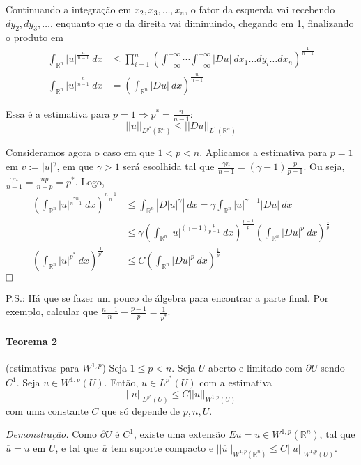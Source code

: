 \documentclass[11pt]{article}
\newcommand{\qed}{$\hfill\square$}
\newcommand{\Rn}{{\mathbb{R}^n}}
\newcommand{\pu}{\partial U}
\newcommand{\nor}[2]{||#1||_{#2}}
\begin{document}
Continuando a integração em $x_2, x_3, \ldots, x_n$, o fator da esquerda vai recebendo $dy_2, dy_3, \ldots$, enquanto que o da direita vai diminuindo, chegando em 1, finalizando o produto em \begin{align*}
	\int_\Rn |u|^{\frac{n}{n-1}}\ dx &\leq \prod_{i=1}^{n} \left(  \int_{-\infty}^{+\infty} \cdots \int_{-\infty}^{+\infty} |Du|\ dx_1 \ldots dy_i \ldots dx_n \right)^{\frac{1}{n-1}}\\
		\int_\Rn |u|^{\frac{n}{n-1}}\ dx &= \left( \int_{\Rn} |Du|\ dx \right)^{\frac{n}{n-1}}
\end{align*}  

Essa é a estimativa para $p=1 \Rightarrow p^* = \frac{n}{n-1}$: \[ ||u||_{L^{p^*}(\Rn)} \leq ||Du||_{L^1(\Rn)} \]



Consideramos agora o caso em que $ 1 < p < n $. Aplicamos a estimativa para $p=1$ em $v:= |u|^\gamma$, em que $\gamma>1$ será escolhida tal que $ \frac{\gamma n}{n-1} = (\gamma -1 ) \frac{p}{p-1} $. Ou seja, $ \frac{\gamma n}{n-1} = \frac{np}{n-p} = p^*$. Logo, \begin{align*}
	\left(\int_\Rn |u|^{\frac{\gamma n}{n-1}}\ dx \right)^{\frac{n-1}{n}} &\leq \int_\Rn \left| D|u|^\gamma \right|\ dx = \gamma \int_\Rn |u|^{\gamma -1} |Du|\ dx \\
	&\leq \gamma \left(  \int_\Rn |u|^{(\gamma -1) \frac{p}{p-1}}\ dx \right)^{\frac{p-1}{p}} \left( \int_\Rn |Du|^p\ dx \right)^{\frac{1}{p}} \\
	\left(\int_\Rn |u|^{p^*}\ dx \right)^{\frac{1}{p^*}} &\leq C \left( \int_\Rn |Du|^p\ dx \right)^{\frac{1}{p}}
\end{align*}\qed


P.S.: Há que se fazer um pouco de álgebra para encontrar a parte final. Por exemplo, calcular que $ \frac{n-1}{n} - \frac{p-1}{p} = \frac{1}{p^*}$.



\paragraph{Teorema 2}\label{t:sobolev-ineq-t2}(estimativas para \( W^{1,p} \)) Seja \( 1\leq p < n \). Seja \(U\) aberto e limitado com \(\partial U\) sendo \(C^1\). Seja \(u \in W^{1,p}(U)\). Então, \(u \in L^{p^*}(U)\) com a estimativa \[ ||u||_{L^{p^*}(U)} \leq C ||u||_{W^{1,p}(U)} \] com uma constante \(C\) que só depende de \(p, n, U\).

\textit{Demonstração.} Como $\pu$ é $C^1$, existe uma extensão $Eu=\overline{u} \in W^{1,p}(\Rn)$, tal que $\overline{u}=u \text{ em } U$, e tal que $\overline{u}$ tem suporte compacto e $ \nor{\overline{u}}{W^{1,p}(\Rn)} \leq C \nor{u}{W^{1,p}(U)} $.
\end{document}
